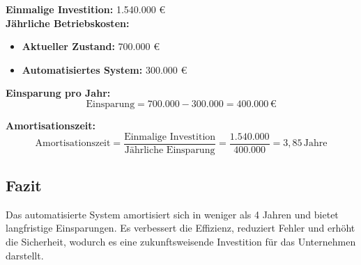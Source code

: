 \textbf{Einmalige Investition:} 1.540.000 € \\

\textbf{Jährliche Betriebskosten:}
\begin{itemize}
	\item \textbf{Aktueller Zustand:} 700.000 €
	\item \textbf{Automatisiertes System:} 300.000 €
\end{itemize}

\textbf{Einsparung pro Jahr:}  
\[
\text{Einsparung} = 700.000 - 300.000 = 400.000 \, \text{€}
\]

\textbf{Amortisationszeit:}  
\[
\text{Amortisationszeit} = \frac{\text{Einmalige Investition}}{\text{Jährliche Einsparung}} = \frac{1.540.000}{400.000} = 3{,}85 \, \text{Jahre}
\]

\subsection*{Fazit}
Das automatisierte System amortisiert sich in weniger als 4 Jahren und bietet langfristige Einsparungen. Es verbessert die Effizienz, reduziert Fehler und erhöht die Sicherheit, wodurch es eine zukunftsweisende Investition für das Unternehmen darstellt.
